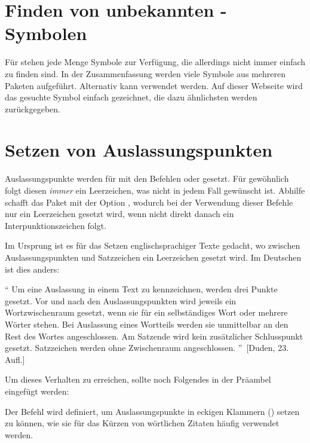 \section{%
  Finden von unbekannten -Symbolen%
}
%
Für  stehen jede Menge Symbole zur Verfügung, die allerdings 
nicht immer einfach zu finden sind. In der Zusammenfassung
%
{}
werden viele Symbole aus mehreren Paketen aufgeführt. Alternativ kann 
 verwendet werden. 
Auf dieser Webseite wird das gesuchte Symbol einfach gezeichnet, die dazu 
ähnlichsten werden zurückgegeben.



\section{%
  Setzen von Auslassungspunkten%
  \label{sec:tips:dots}%
}
%
%
Auslassungspunkte werden für  mit den Befehlen  oder 
 gesetzt. Für gewöhnlich folgt diesen \emph{immer} ein 
Leerzeichen, was nicht in jedem Fall gewünscht ist. Abhilfe schafft das Paket 
 mit der Option , wodurch bei der Verwendung 
dieser Befehle nur ein Leerzeichen gesetzt wird, wenn nicht direkt danach ein 
Interpunktionszeichen folgt.
%
\begin{quoting}
\begin{Code}
\usepackage[xspace]{ellipsis}
\end{Code}
\end{quoting}
%
Im Ursprung ist es für das Setzen englischsprachiger Texte gedacht, wo zwischen 
Auslassungspunkten und Satzzeichen ein Leerzeichen gesetzt wird. Im Deutschen 
ist dies anders:
%
\begin{quoting}
\enquote{%
  Um eine Auslassung in einem Text zu kennzeichnen, werden drei Punkte gesetzt. 
  Vor und nach den Auslassungspunkten wird jeweils ein Wortzwischenraum 
  gesetzt, wenn sie für ein selbständiges Wort oder mehrere Wörter stehen. Bei 
  Auslassung eines Wortteils werden sie unmittelbar an den Rest des Wortes 
  angeschlossen. Am Satzende wird kein zusätzlicher Schlusspunkt gesetzt. 
  Satzzeichen werden ohne Zwischenraum angeschlossen.%
}~[Duden, 23. Aufl.]
\end{quoting} 
%
Um dieses Verhalten zu erreichen, sollte noch Folgendes in der Präambel 
eingefügt werden:
%
\begin{quoting}
\begin{Code}
\let\ellipsispunctuation\relax
\newcommand*{\qdots}{[\dots{}]\xspace}
\end{Code}
\end{quoting}
%
Der Befehl  wird definiert, um Auslassungspunkte in eckigen 
Klammern (\OPValue{\dots}) setzen zu können, wie sie für das Kürzen von 
wörtlichen Zitaten häufig verwendet werden.



